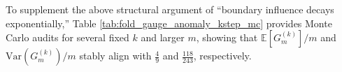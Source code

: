 \begin{remark}\label{rem:fold-gauge-anomaly-kstep-mc}
To supplement the above structural argument of ``boundary influence decays exponentially,'' Table \ref{tab:fold_gauge_anomaly_kstep_mc} provides Monte Carlo audits for several fixed \(k\) and larger \(m\), showing that \(\mathbb E[G_m^{(k)}]/m\) and \(\mathrm{Var}(G_m^{(k)})/m\) stably align with \(\frac49\) and \(\frac{118}{243}\), respectively.
\end{remark}


